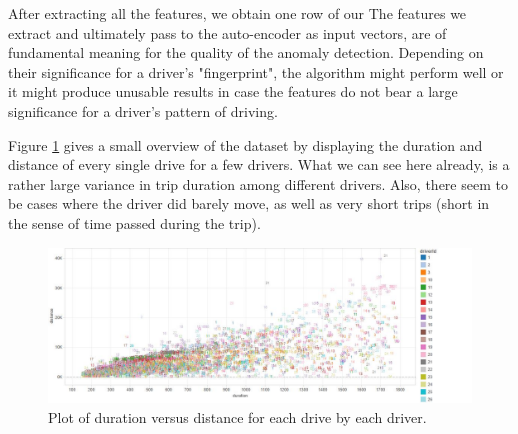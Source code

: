 \documentclass{vldb}
\begin{document}

After extracting all the features, we obtain one row of our 
The features we extract and ultimately pass to the auto-encoder as input vectors, are of fundamental meaning for the quality of the anomaly detection. Depending on their significance for a driver's "fingerprint", the algorithm might perform well or it might produce unusable results in case the features do not bear a large significance for a driver's pattern of driving. 

Figure \ref{fig:duration-vs-distance} gives a small overview of the dataset by displaying the duration and distance of every single drive for a few drivers. What we can see here already, is a rather large variance in trip duration among different drivers. Also, there seem to be cases where the driver did barely move, as well as very short trips (short in the sense of time passed during the trip).\\
\begin{figure}
\centering
\includegraphics[width=\linewidth]{"pics/duration-vs-distance-driver"}
\caption{Plot of duration versus distance for each drive by each driver. }
\label{fig:duration-vs-distance}
\end{figure}
\end{document}
